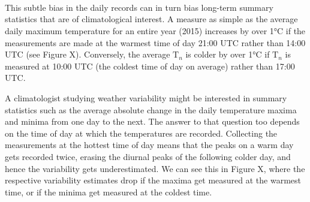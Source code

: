 \documentclass[letter]{article}
\newcommand{\T}{\mathrm{T}}
\newcommand{\Tn}{\T_{n}}
\begin{document}
    			
    \begin{figure}[tbh]
    \begin{center}
    \end{center}
    { \hspace*{\fill} \\}
	\end{figure}
    
    		

    			
    \begin{figure}[tbh]
    \begin{center}
    \end{center}
    { \hspace*{\fill} \\}
	\end{figure}
    
    		

    			
    \begin{figure}[tbh]
    \begin{center}
    \end{center}
    { \hspace*{\fill} \\}
	\end{figure}
    
    		
    	This subtle bias in the daily records can in turn bias long-term summary
statistics that are of climatological interest. A measure as simple as
the average daily maximum temperature for an entire year (2015)
increases by over 1°C if the measurements are made at the warmest time
of day 21:00 UTC rather than 14:00 UTC (see Figure X). Conversely, the
average \(\Tn\) is colder by over 1°C if \(\Tn\) is measured at 10:00
UTC (the coldest time of day on average) rather than 17:00 UTC.

A climatologist studying weather variability might be interested in
summary statistics such as the average absolute change in the daily
temperature maxima and minima from one day to the next. The answer to
that question too depends on the time of day at which the temperatures
are recorded. Collecting the measurements at the hottest time of day
means that the peaks on a warm day gets recorded twice, erasing the
diurnal peaks of the following colder day, and hence the variability
gets underestimated. We can see this in Figure X, where the respective
variability estimates drop if the maxima get measured at the warmest
time, or if the minima get measured at the coldest time.
    
\end{document}
